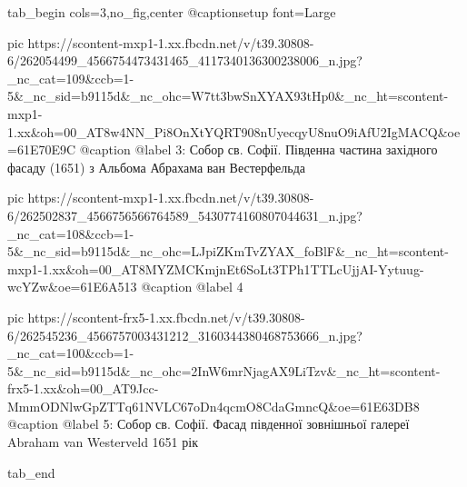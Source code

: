  
 
 
 
 


\ifcmt
  tab_begin cols=3,no_fig,center
     @captionsetup font=Large

     pic https://scontent-mxp1-1.xx.fbcdn.net/v/t39.30808-6/262054499_4566754473431465_4117340136300238006_n.jpg?_nc_cat=109&ccb=1-5&_nc_sid=b9115d&_nc_ohc=W7tt3bwSnXYAX93tHp0&_nc_ht=scontent-mxp1-1.xx&oh=00_AT8w4NN_Pi8OnXtYQRT908nUyecqyU8nuO9iAfU2IgMACQ&oe=61E70E9C
     @caption @label 3: Собор св. Софії. Південна частина західного фасаду (1651) з Альбома Абрахама ван Вестерфельда

     pic https://scontent-mxp1-1.xx.fbcdn.net/v/t39.30808-6/262502837_4566756566764589_5430774160807044631_n.jpg?_nc_cat=108&ccb=1-5&_nc_sid=b9115d&_nc_ohc=LJpiZKmTvZYAX_foBlF&_nc_ht=scontent-mxp1-1.xx&oh=00_AT8MYZMCKmjnEt6SoLt3TPh1TTLcUjjAI-Yytuug-wcYZw&oe=61E6A513
     @caption @label 4

     pic https://scontent-frx5-1.xx.fbcdn.net/v/t39.30808-6/262545236_4566757003431212_3160344380468753666_n.jpg?_nc_cat=100&ccb=1-5&_nc_sid=b9115d&_nc_ohc=2InW6mrNjagAX9LiTzv&_nc_ht=scontent-frx5-1.xx&oh=00_AT9Jcc-MmmODNlwGpZTTq61NVLC67oDn4qcmO8CdaGmncQ&oe=61E63DB8
     @caption @label 5: Собор св. Софії. Фасад південної зовнішньої галереї Abraham van Westerveld 1651 рік

  tab_end
\fi
